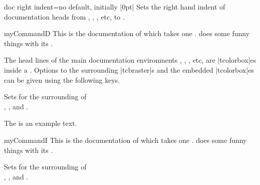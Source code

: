 \begin{docTcbKey}{doc right indent}{=}{no default, initially |0pt|}
  Sets the right hand indent of documentation heads from
  , , , etc, to .
\begin{dispExample}
\begin{docCommand*}[doc right indent=-10mm,doc right=10mm,
    doc description=test value]{myCommandD}{}
  This is the documentation of  which takes one .
   does some funny things with its .
\end{docCommand*}
\end{dispExample}
\end{docTcbKey}

\clearpage
The head lines of the main documentation environments ,
, , etc, are |tcolorbox|es inside a
.
Options to the surrounding |tcbraster|s and the embedded
|tcolorbox|es can be given using the following keys.


\begin{docTcbKeys}[
  doc name        = doc raster command,
  doc parameter   = {=\meta{options}},
  doc description = {no default, initially empty},
  doc new         = 2020-04-24,
]{}
  Sets  for the surrounding  of\\
  , , and .

\begin{dispExample}

The is an example text.

\begin{docCommand*}{myCommandI}{}
  This is the documentation of  which takes one .
   does some funny things with its .
\end{docCommand*}
\end{dispExample}

\end{docTcbKeys}


\begin{docTcbKeys}[
  doc name        = doc raster environment,
  doc parameter   = {=\meta{options}},
  doc description = {no default, initially empty},
  doc new         = 2020-04-24,
]{}
  Sets  for the surrounding  of\\
  , , and .
\end{docTcbKeys}


